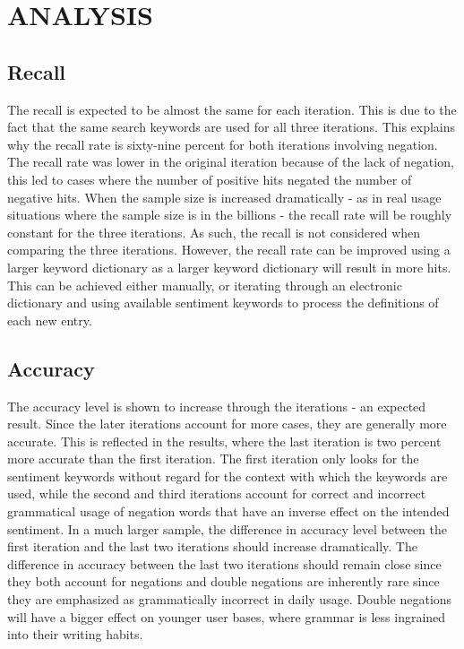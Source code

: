 \section{ANALYSIS} %
\label{sec:analysis}

\subsection{Recall} %
\label{sub:recall}
The recall is expected to be almost the same for each iteration. This is due to the fact that the same search keywords are used for all three iterations. This explains why the recall rate is sixty-nine percent for both iterations involving negation.  The recall rate was lower in the original iteration because of the lack of negation, this led to cases where the number of positive hits negated the number of negative hits.  When the sample size is increased dramatically - as in real usage situations where the sample size is in the billions - the recall rate will be roughly constant for the three iterations.  As such, the recall is not considered when comparing the three iterations.  However, the recall rate can be improved using a larger keyword dictionary as a larger keyword dictionary will result in more hits.  This can be achieved either manually, or iterating through an electronic dictionary and using available sentiment keywords to process the definitions of each new entry.

\subsection{Accuracy} %
\label{sub:Accuracy}
The accuracy level is shown to increase through the iterations - an expected result.  Since the later iterations account for more cases, they are generally more accurate.  This is reflected in the results, where the last iteration is two percent more accurate than the first iteration.  The first iteration only looks for the sentiment keywords without regard for the context with which the keywords are used, while the second and third iterations account for correct and incorrect grammatical usage of negation words that have an inverse effect on the intended sentiment.  In a much larger sample, the difference in accuracy level between the first iteration and the last two iterations should increase dramatically.  The difference in accuracy between the last two iterations should remain close since they both account for negations and double negations are inherently rare since they are emphasized as grammatically incorrect in daily usage.  Double negations will have a bigger effect on younger user bases, where grammar is less ingrained into their writing habits.

